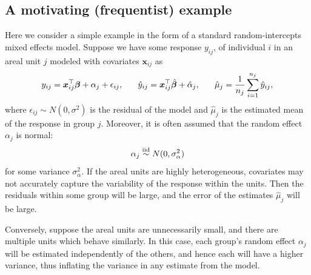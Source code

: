 \documentclass[twoside,12pt,bibstyle=chem-acs]{reedthesis}
\begin{document}
\subsection{A motivating (frequentist) example}
\label{sbsc: freq example}
Here we consider a simple example in the form of a standard random-intercepts mixed effects model. 
Suppose we have some response $y_{ij}$, of individual $i$ in an areal unit $j$ modeled with covariates $\bm{x}_{ij}$ as
\begin{equation}
y_{ij} = \bm{x}_{ij}^\top \bm\beta + \alpha_j + \epsilon_{ij}, \hspace{0.05\linewidth} \hat{y}_{ij} = \bm{x}_{ij}^\top \hat{\bm\beta} + \hat\alpha_j, \hspace{0.05\linewidth} \hat{\mu}_j = \frac{1}{n_j}\sum_{i=1}^{n_j} \hat{y}_{ij}%
\label{eq: simple lme},
\end{equation}
where $\epsilon_{ij} \sim N(0,\sigma^2)$ is the residual of the model and $\hat\mu_j$ is the estimated mean of the response in group $j$. Moreover, it is often assumed that the random effect $\alpha_j$ is normal:
\begin{equation}
\alpha_j \overset{\mathrm{iid}}{\sim} N(0,\sigma_\alpha^2)
\label{eq: standard RI}
\end{equation}
for some variance $\sigma_\alpha^2$.
If the areal units are highly heterogeneous, covariates may not accurately capture the variability of the response within the units. Then the residuals within some group %
will be large, and the error of the estimates $\hat{\mu}_j$ will be large.

Conversely, suppose the areal units are unnecessarily small, and there are multiple units which behave similarly. In this case, each group's random effect $ \alpha_j$ will be estimated independently of the others, and hence each will have a higher variance, thus inflating the variance in any estimate from the model. 
\end{document}
